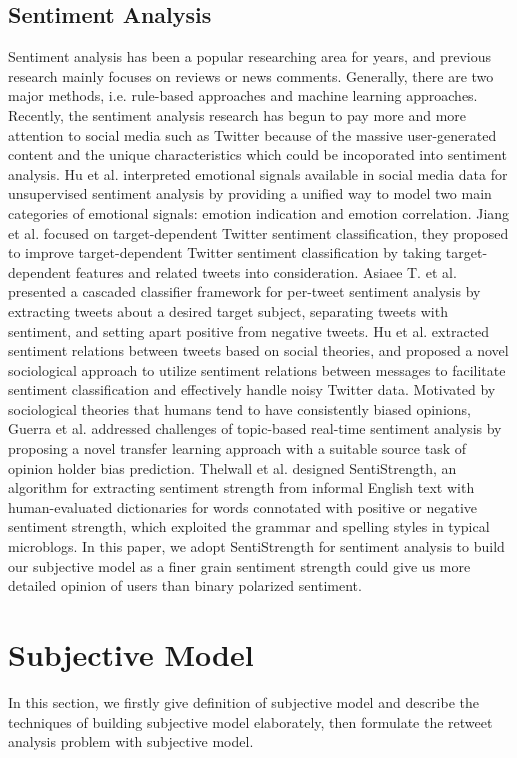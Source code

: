 \documentclass[preprint]{elsarticle}
\begin{document}
\subsection{Sentiment Analysis}
Sentiment analysis has been a popular researching area for years, and previous research mainly focuses on reviews or news comments. 
Generally, there are two major methods, i.e. rule-based approaches and machine learning approaches. 
Recently, the sentiment analysis research has begun to pay more and more attention to social media such as Twitter because of the massive user-generated content and the unique characteristics which could be incoporated into sentiment analysis. 
Hu et al.\cite{Hu:2013www} interpreted emotional signals available in social media data for unsupervised sentiment analysis by providing a unified way to model two main categories of emotional signals: emotion indication and emotion correlation. 
Jiang et al.\cite{Jiang:2011TTS} focused on target-dependent Twitter sentiment classification, they proposed to improve target-dependent Twitter sentiment classification by taking target-dependent features and related tweets into consideration. 
Asiaee T. et al.\cite{AsiaeeT:2012} presented a cascaded classifier framework for per-tweet sentiment analysis by extracting tweets about a desired target subject, separating tweets with sentiment, and setting apart positive from negative tweets.
Hu et al.\cite{Hu:2013ESR} extracted sentiment relations between tweets based on social theories, and proposed a novel sociological approach to utilize sentiment relations between messages to facilitate sentiment classification and effectively handle noisy Twitter data.
Motivated by sociological theories that humans tend to have consistently biased opinions, Guerra et al.\cite{CalaisGuerra:2011BOT} addressed challenges of topic-based real-time sentiment analysis by proposing a novel transfer learning approach with a suitable source task of opinion holder bias prediction.
Thelwall et al.\cite{Thelwall:2010SSS,Thelwall:2012SSD} designed SentiStrength, an algorithm for extracting sentiment strength from informal English text with human-evaluated dictionaries for words connotated with positive or negative sentiment strength, which exploited the grammar and spelling styles in typical microblogs.
In this paper, we adopt SentiStrength for sentiment analysis to build our subjective model as a finer grain sentiment strength could give us more detailed opinion of users than binary polarized sentiment.
\section{Subjective Model}
\label{subjectivemodel}
In this section, we firstly give definition of subjective model and describe the techniques of building subjective model elaborately, then formulate the retweet analysis problem with subjective model.
\end{document}
